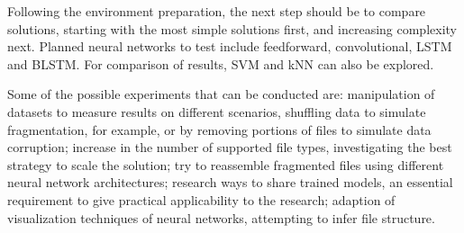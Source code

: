





Following the environment preparation, the next step should be to compare solutions, starting with the most simple solutions first, and increasing complexity next. Planned neural networks to test include feedforward, convolutional, LSTM and BLSTM. For comparison of results, SVM and kNN can also be explored.

Some of the possible experiments that can be conducted are:
%
manipulation of datasets to measure results on different scenarios,  shuffling data to simulate fragmentation, for example, or by removing portions of files to simulate data corruption;
%
increase in the number of supported file types, investigating the best strategy to scale the solution;
%
try to reassemble fragmented files using different neural network architectures;
%
research ways to share trained models, an essential requirement to give practical applicability to the research;
%
adaption of visualization techniques of neural networks, attempting to infer file structure.
